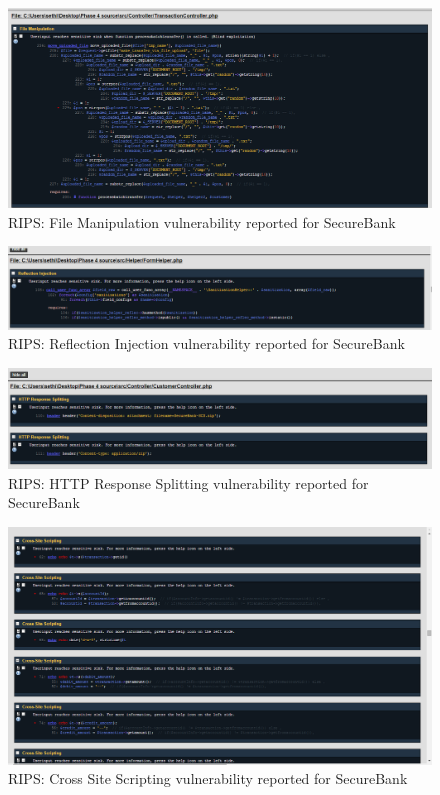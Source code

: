 \begin{figure}[ht]
	\centering
	\includegraphics[width=.8\linewidth]{figures/rips_file_manipulation_secure_bank.png}
	\caption{RIPS: File Manipulation vulnerability reported for SecureBank}
	\label{fig:rips_file_manipulation_secure_bank}
\end{figure}

\begin{figure}[ht]
	\centering
	\includegraphics[width=.8\linewidth]{figures/rips_reflection_injection_secure_bank.png}
	\caption{RIPS: Reflection Injection vulnerability reported for SecureBank}
	\label{fig:rips_reflection_injection_secure_bank}
\end{figure}

\begin{figure}[ht]
	\centering
	\includegraphics[width=.8\linewidth]{figures/rips_http_resp_splitting_secure_bank.png}
	\caption{RIPS: HTTP Response Splitting vulnerability reported for SecureBank}
	\label{fig:rips_http_resp_splitting_secure_bank}
\end{figure}


\begin{figure}[ht]
	\centering
	\includegraphics[width=.8\linewidth]{figures/rips_xss_secure_bank.png}
	\caption{RIPS: Cross Site Scripting vulnerability reported for SecureBank}
	\label{fig:rips_xss_secure_bank}
\end{figure}